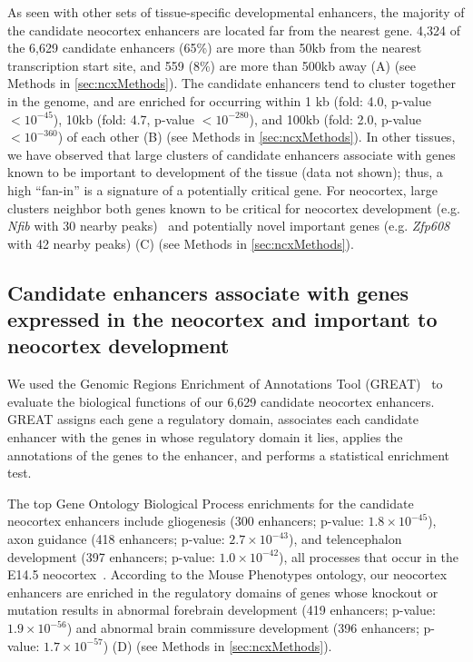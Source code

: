 As seen with other sets of tissue-specific developmental enhancers, the majority of the candidate neocortex enhancers are located
far from the nearest gene.  4,324 of the 6,629 candidate enhancers (65\%) are more than 50kb from the nearest transcription start site,
and 559 (8\%) are more than 500kb away (A) (see Methods in \ref{sec:ncxMethods}).  The candidate enhancers tend to cluster together
in the genome, and are enriched for occurring within 1 kb (fold: 4.0, p-value $< 10^{-45}$), 10kb
(fold: 4.7, p-value $< 10^{-280}$), and 100kb (fold: 2.0, p-value $< 10^{-360}$) of each
other (B) (see Methods in \ref{sec:ncxMethods}).  In other tissues, we have observed that large clusters of candidate enhancers associate
with genes known to be important to development of the tissue (data not shown); thus, a high ``fan-in'' is a signature
of a potentially critical gene.  For neocortex, large clusters neighbor both genes known to be critical for neocortex development
(e.g. \textit{Nfib} with 30 nearby peaks)~\citep{Piper2009} and potentially novel important genes (e.g. \textit{Zfp608} with 42 nearby peaks)
(C) (see Methods in \ref{sec:ncxMethods}).

\subsection{Candidate enhancers associate with genes expressed in the neocortex and important to neocortex development}
We used the Genomic Regions Enrichment of Annotations Tool (GREAT)~\citep{McLean2010} to evaluate the biological functions
of our 6,629 candidate neocortex enhancers.  GREAT assigns each gene a regulatory domain, associates each candidate enhancer
with the genes in whose regulatory domain it lies, applies the annotations of the genes to the enhancer, and performs a
statistical enrichment test.

The top Gene Ontology Biological Process enrichments for the candidate neocortex enhancers include gliogenesis
(300 enhancers; p-value: $1.8\times10^{-45}$), axon guidance (418 enhancers; p-value: $2.7\times10^{-43}$),
and telencephalon development (397 enhancers; p-value: $1.0\times10^{-42}$), all processes that occur in the E14.5
neocortex~\citep{Choi1988, Molyneaux2007}.  According to the Mouse Phenotypes ontology, our neocortex enhancers are enriched in the
regulatory domains of genes whose knockout or mutation results in abnormal forebrain development (419 enhancers; p-value: $1.9\times10^{-56}$)
and abnormal brain commissure development (396 enhancers; p-value: $1.7\times10^{-57}$) (D) (see Methods in \ref{sec:ncxMethods}).

